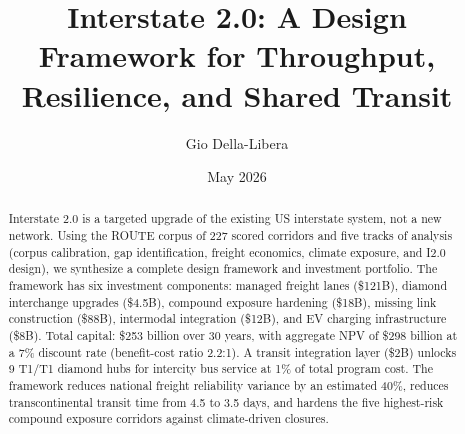 \documentclass[12pt]{article}
\title{Interstate 2.0: A Design Framework for Throughput, Resilience, and Shared Transit}
\author{Gio Della-Libera}
\date{May 2026}
\begin{document}
\maketitle
\begin{abstract}
Interstate 2.0 is a targeted upgrade of the existing US interstate system, not a new network. Using the ROUTE corpus of 227 scored corridors and five tracks of analysis (corpus calibration, gap identification, freight economics, climate exposure, and I2.0 design), we synthesize a complete design framework and investment portfolio. The framework has six investment components: managed freight lanes (\$121B), diamond interchange upgrades (\$4.5B), compound exposure hardening (\$18B), missing link construction (\$88B), intermodal integration (\$12B), and EV charging infrastructure (\$8B). Total capital: \$253 billion over 30 years, with aggregate NPV of \$298 billion at a 7\% discount rate (benefit-cost ratio 2.2:1). A transit integration layer (\$2B) unlocks 9 T1/T1 diamond hubs for intercity bus service at 1\% of total program cost. The framework reduces national freight reliability variance by an estimated 40\%, reduces transcontinental transit time from 4.5 to 3.5 days, and hardens the five highest-risk compound exposure corridors against climate-driven closures.
\end{abstract}









\end{document}
